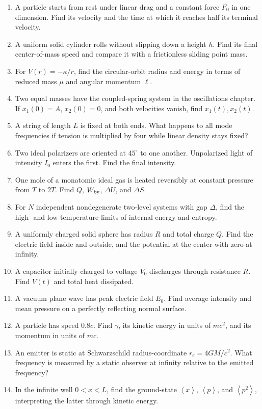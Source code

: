 \documentclass[11pt,oneside]{book}
\newcommand{\avg}[1]{\left\langle #1\right\rangle}
\theoremstyle{reviewstyle}
\begin{document}
\begin{enumerate}
\item A particle starts from rest under linear drag and a constant force $F_0$ in one dimension. Find its velocity and the time at which it reaches half its terminal velocity.
\item A uniform solid cylinder rolls without slipping down a height $h$. Find its final center-of-mass speed and compare it with a frictionless sliding point mass.
\item For $V(r)=-\kappa/r$, find the circular-orbit radius and energy in terms of reduced mass $\mu$ and angular momentum $\ell$.
\item Two equal masses have the coupled-spring system in the oscillations chapter. If $x_1(0)=A$, $x_2(0)=0$, and both velocities vanish, find $x_1(t),x_2(t)$.
\item A string of length $L$ is fixed at both ends. What happens to all mode frequencies if tension is multiplied by four while linear density stays fixed?
\item Two ideal polarizers are oriented at $45^\circ$ to one another. Unpolarized light of intensity $I_0$ enters the first. Find the final intensity.
\item One mole of a monatomic ideal gas is heated reversibly at constant pressure from $T$ to $2T$. Find $Q$, $W_{\rm by}$, $\Delta U$, and $\Delta S$.
\item For $N$ independent nondegenerate two-level systems with gap $\Delta$, find the high- and low-temperature limits of internal energy and entropy.
\item A uniformly charged solid sphere has radius $R$ and total charge $Q$. Find the electric field inside and outside, and the potential at the center with zero at infinity.
\item A capacitor initially charged to voltage $V_0$ discharges through resistance $R$. Find $V(t)$ and total heat dissipated.
\item A vacuum plane wave has peak electric field $E_0$. Find average intensity and mean pressure on a perfectly reflecting normal surface.
\item A particle has speed $0.8c$. Find $\gamma$, its kinetic energy in units of $mc^2$, and its momentum in units of $mc$.
\item An emitter is static at Schwarzschild radius-coordinate $r_e=4GM/c^2$. What frequency is measured by a static observer at infinity relative to the emitted frequency?
\item In the infinite well $0<x<L$, find the ground-state $\avg x$, $\avg p$, and $\avg{p^2}$, interpreting the latter through kinetic energy.

\end{enumerate}
\end{document}
